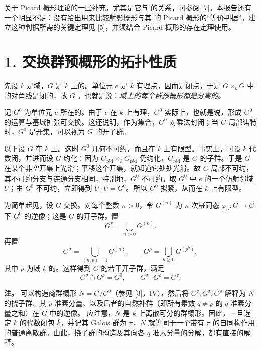 关于 Picard 概形理论的一些补充，尤其是它与 的关系，可参阅 [7]。本报告还有一个明显不足：没有给出用来比较射影概形与其 的 Picard 概形的“等价判据”。建立这种判据所需的关键定理见 [5]，并须结合 Picard 概形的存在定理使用。

\section*{1. 交换群预概形的拓扑性质}
先设 $k$ 是域，$G$ 是 $k$ 上的。单位元 $e$ 是 $k$ 有理点，因而是闭点，于是 $G\times_kG$ 中的对角线是闭的，故 $G$ 。也就是说：\emph{域上的每个群预概形都是分离的。}

记 $G^0$ 为单位元 $e$ 所在的。由于 $e$ 在 $k$ 上有理，$G^0$ 实际上，也就是说，形成 $G^0$ 的运算与基域扩张可交换。这还说明，作为集合，$G^0$ 对乘法封闭；当 $G$ 局部诺特时，$G^0$ 是开集，可以视为 $G$ 的开子群。

以下设 $G$ 在 $k$ 上。这时 $G^0$ 几何不可约，而且在 $k$ 上有限型。事实上，可设 $k$ 代数闭，并进而设 $G$ 约化：因为 $G_{\text{réd}}\times_kG_{\text{réd}}$ 仍约化，$G_{\text{réd}}$ 是 $G$ 的子群。于是 $G$ 在某个非空开集上光滑；平移这个开集，就知道它处处光滑。故 $G$ 局部不可约，其不可约分支与连通分支相同，特别地，$G^0$ 不可约。取 $G^0$ 中 $e$ 的一个仿射邻域 $U$；由 $G^0$ 不可约，立即得到 $U\cdot U=G^0$。所以 $G^0$ 拟紧，从而在 $k$ 上有限型。

为简单起见，设 $G$ 交换。对每个整数 $n>0$，令 $G^{(n)}$ 为 $n$ 次幂同态 $\varphi_n\colon G\to G$ 下 $G^0$ 的逆像；这是 $G$ 的开子群。置
\[
 G^\tau=\bigcup_{n>0}G^{(n)}.
\]
再置
\[
 G^\sigma=\bigcup_{(n,p)=1}G^{(n)},\qquad
 G^\rho=\bigcup_{h\geq0}G^{(p^h)},
\]
其中 $p$ 为域 $k$ 的。这样得到 $G$ 的若干开子群，满足
\[
 G^\sigma\cap G^\rho=G^0,\qquad G^\sigma\cdot G^\rho=G^\tau.
\]

\textbf{注。} 可以构造商群概形 $N=G/G^0$（参见 [3]，IV），然后将 $G^\tau,G^\sigma,G^\rho$ 解释为 $N$ 的挠子群、其 $p$ 准素分量、以及后者的自然补群（即所有素数 $q\ne p$ 的 $q$ 准素分量之和）在 $G$ 中的逆像。
应注意，$N$ 是 $k$ 上离散可分的群概形。因此，一旦选定 $k$ 的代数闭包 $\bar k$，并记其 Galois 群为 $\pi$，$N$ 就等同于一个带有 $\pi$ 的自同构作用的普通离散群。由此，挠子群的构造及其向各 $q$ 准素分量的分解，都有直接的解释。

